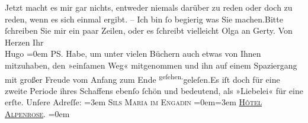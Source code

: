 \begin{ledgroupsized}[t]{13cm}
           \pstart
           Jetzt macht es mir gar nichts, {\pb}entweder niemals darüber zu reden oder doch zu reden, wenn es sich einmal
               ergibt.\pend
           \pstart
           \numberlinefalse{}–\numberlinetrue{}\pend
           \pstart
           Ich bin ſo begierig was Sie machen.\hspace*{1.5em}Bitte ſchreiben
               Sie mir ein paar Zeilen, oder es ſchreibt vielleicht Olga an Gerty.\pend
           \pstart
           Von Herzen Ihr{\\[\baselineskip]}\spacefill\mbox{Hugo}\pend
           \leftskip=0em{}\pstart
           \noindent{}PS. Habe, um unter vielen Büchern auch etwas von Ihnen mitzuhaben, den »einſamen Weg« mitgenommen und ihn auf einem
                  Spaziergang mit großer Freude vom Anfang zum Ende \substVorne{}\textsuperscript{geſehen.}{\allowbreak}\substDazwischen{}geleſen.\substHinten{}\hspace*{1.5em}Es iſt doch für eine zweite Periode ihres
                  Schaffens ebenſo ſchön und bedeutend, als {\pb}»Liebelei« für eine erſte.\pend
           \pstart
           Unſere Adreſſe:\pend
           \leftskip=3em{}\pstart
           \noindent{}\textsc{Sils Maria im Engadin}\pend
           \leftskip=0em{}\leftskip=3em{}\pstart
           \textsc{\uline{Hôtel Alpenrose}}.\pend
           \leftskip=0em{}
         
         \endnumbering{}\end{ledgroupsized}  \newcommand{\dateiname}{L01785}\newcommand{\titel}{Hugo von Hofmannsthal an Arthur Schnitzler, 24. 7. [1908]}\newcommand{\editorInnen}{Martin Anton Müller und Gerd-Hermann Susen}
      